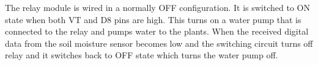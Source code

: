 The relay module is wired in a normally OFF configuration. It is switched to ON state when both VT and D8 pins are high. This turns on a water pump that is connected to the relay and pumps water to the plants. When the received digital data from the soil moisture sensor becomes low and the switching circuit turns off relay and it switches back to OFF state which turns the water pump off.

